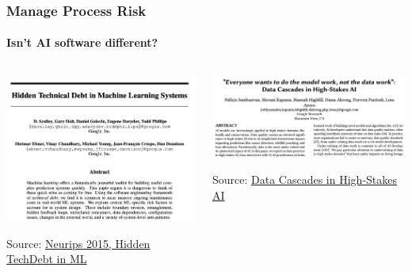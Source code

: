 \begin{frame}
    \frametitle{Manage Process Risk}
    \framesubtitle{Isn't AI software different?}
    \begin{columns}[T] %
        \begin{column}{.4\textwidth}
            \begin{center}
                \includegraphics[height=0.35\textheight]{graphics/neurips-hidden-tech-debt}
            \end{center}
            Source: \href{https://proceedings.neurips.cc/paper/2015/hash/86df7dcfd896fcaf2674f757a2463eba-Abstract.html}{Neurips 2015, Hidden TechDebt in ML}
        \end{column}%
        \begin{column}{.4\textwidth}
            \begin{center}
                \includegraphics[height=0.25\textheight]{graphics/data-cascades}
            \end{center}
            Source: \href{https://nithyasambasivancom.files.wordpress.com/2021/01/sambasivan_cascades_chi2021.pdf}{Data Cascades in High-Stakes AI}
        \end{column}%
    \end{columns}

\end{frame}

